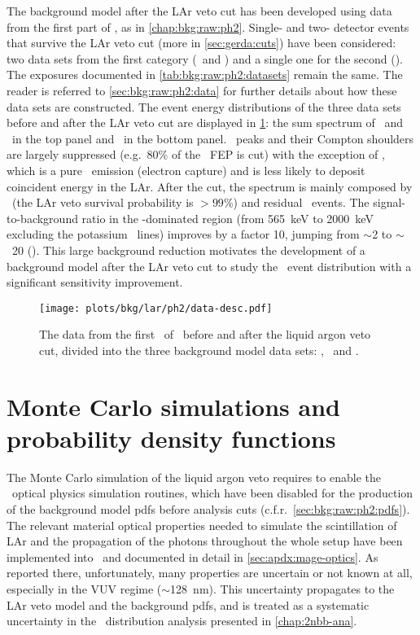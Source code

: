 The background model after the LAr veto cut has been developed using data from the first
part of \gerdatwo, as in \cref{chap:bkg:raw:ph2}. Single- and two- detector events that
survive the LAr veto cut (more in \cref{sec:gerda:cuts}) have been considered: two data
sets from the first category (\enrBEGeII\ and \enrCoaxII) and a single one for the second
(\enrGeII). The exposures documented in \cref{tab:bkg:raw:ph2:datasets} remain the same.
The reader is referred to \cref{sec:bkg:raw:ph2:data} for further details about how these
data sets are constructed.
\newpar
The event energy distributions of the three data sets before and after the LAr veto cut
are displayed in \cref{fig:bkg:lar:ph2:data-desc}: the sum spectrum of \enrBEGeII\ and
\enrCoaxII\ in the top panel and \enrGeII\ in the bottom panel. \g\ peaks and their
Compton shoulders are largely suppressed (e.g.~80\% of the \kvz\ FEP is cut) with the
exception of \kvn, which is a pure \g\ emission (electron capture) and is less likely to
deposit coincident energy in the LAr. After the cut, the spectrum is mainly composed by
\nnbb\ (the LAr veto survival probability is $>99$\%) and residual \a\ events. The
signal-to-background ratio in the \nnbb-dominated region (from 565~keV to 2000~keV
excluding the potassium \g\ lines) improves by a factor 10, jumping from $\sim$2 to
$\sim$~20 (). This large background reduction motivates the
development of a background model after the LAr veto cut to study the \nnbb\ event
distribution with a significant sensitivity improvement.

\begin{figure}
  \centering
  \texttt{[image: plots/bkg/lar/ph2/data-desc.pdf]}
  \caption{%
    The data from the first \gexpophasetwobkg\ of \gerdatwo\ before and after the liquid argon veto
    cut, divided into the three background model data sets: \enrBEGeII, \enrCoaxII\ and
    \enrGeII. 
  }\label{fig:bkg:lar:ph2:data-desc}
\end{figure}

\section{Monte Carlo simulations and probability density functions}%
\label{sec:bkg:lar:ph2:pdfs}

The Monte Carlo simulation of the liquid argon veto requires to enable the \geant\ optical physics
simulation routines, which have been disabled for the production of the background model
pdfs before analysis cuts (c.f.r.~\cref{sec:bkg:raw:ph2:pdfs}). The relevant material
optical properties needed to simulate the scintillation of LAr and the propagation of the
photons throughout the whole setup have been implemented into \mage\ and documented in
detail in \cref{sec:apdx:mage-optics}. As reported there, unfortunately, many properties
are uncertain or not known at all, especially in the VUV regime ($\sim$128~nm). This
uncertainty propagates to the LAr veto model and the background pdfs, and is treated as a
systematic uncertainty in the \nnbb\ distribution analysis presented in
\cref{chap:2nbb-ana}.

